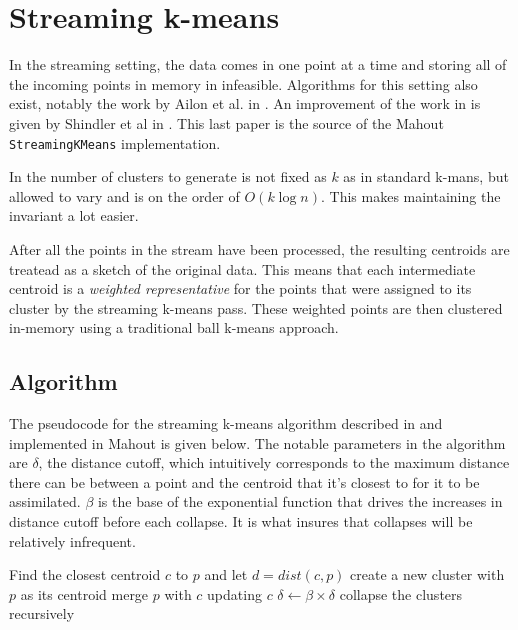 \documentclass{article}
\begin{document}
\section{Streaming k-means}

In the streaming setting, the data comes in one point at a time and storing all
of the incoming points in memory in infeasible. Algorithms for this setting
also exist, notably the work by Ailon et al. in \cite{skm1}.
An improvement of the work in \cite{skm1} is given by Shindler et al in
\cite{fastskm}. This last paper is the source of the Mahout
\texttt{StreamingKMeans} implementation.

In \cite{fastskm} the number of clusters to generate is not fixed as $k$ as in
standard k-mans, but allowed to vary and is on the order of $O(k \log n)$. This
makes maintaining the invariant a lot easier.

After all the points in the stream have been processed, the resulting centroids
are treatead as a sketch of the original data. This means that each
intermediate centroid is a \textit{weighted representative} for the points that
were assigned to its cluster by the streaming k-means pass.
These weighted points are then clustered in-memory using a traditional ball
k-means approach.

\subsection{Algorithm}

The pseudocode for the streaming k-means algorithm described in
\cite{fastskm} and implemented in Mahout is given below. The notable parameters
in the algorithm are $\delta$, the distance cutoff, which intuitively
corresponds to the maximum distance there can be between a point and the
centroid that it's closest to for it to be assimilated. $\beta$ is the base of
the exponential function that drives the increases in distance cutoff before
each collapse. It is what insures that collapses will be relatively infrequent.

\begin{algorithmic}[1]
        \State Find the closest centroid $c$ to $p$ and let $d = dist(c, p)$
            \State create a new cluster with $p$ as its centroid
        \Else
            \State merge $p$ with $c$ updating $c$
        \EndIf
            \State $\delta \gets \beta \times \delta$
            \State collapse the clusters recursively
        \EndIf
    \EndFor
\end{algorithmic}
\end{document}
